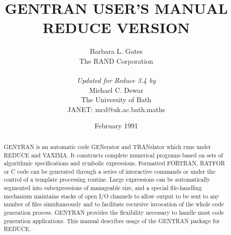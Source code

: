 
\sloppy

\def\indented{\list{}{
 \itemindent\listparindent 
 \rightmargin\leftmargin}\item[]} 
\let\endindented=\endlist
\newenvironment{describe}[1]{\par{\bf #1}\begin{indented}}{\end{indented}}

\setlength{\parskip}{\medskipamount}
\setlength{\parindent}{0pt}




\title{\bf GENTRAN USER'S MANUAL \\ REDUCE VERSION}
\author{Barbara L. Gates \\
The RAND Corporation \\
\\
{\em Updated for Reduce 3.4 by} \\
Michael C. Dewar \\
The University of Bath \\
JANET: mcd@uk.ac.bath.maths\\
}

\date{February 1991}

\maketitle

\begin{abstract}
GENTRAN is an automatic code GENerator and TRANslator which runs
under REDUCE and VAXIMA.  It constructs complete numerical
programs based on sets of algorithmic specifications and symbolic
expressions.  Formatted
FORTRAN, RATFOR or C code can be generated
through a series of
interactive commands or under the control of a template
processing routine.  Large expressions can be automatically
segmented into subexpressions of manageable size, and a special
file-handling mechanism maintains stacks of open I/O channels to allow
output to be sent to any number of files simultaneously and to facilitate
recursive invocation of the whole code generation process.  GENTRAN
provides the flexibility necessary to handle most code generation
applications.  This manual describes usage of the GENTRAN package for REDUCE.
\end{abstract}

